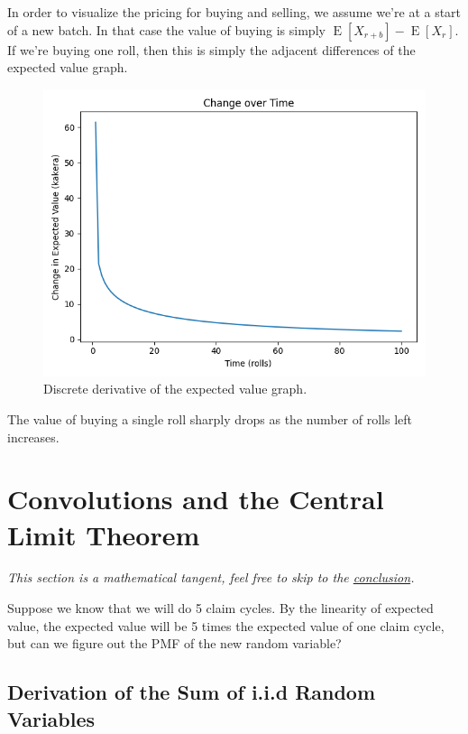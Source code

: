 \documentclass[11pt, oneside]{article}
\DeclareMathOperator{\E}{E}
\theoremstyle{plain}
\theoremstyle{definition}
\begin{document}
In order to visualize the pricing for buying and selling, we assume we're
at a start of a new batch. In that case the value of buying is simply \(
\E[X_{r + b}] - \E[X_r] \). If we're buying one roll, then this is simply
the adjacent differences of the expected value graph.
\begin{figure}[h!]
  \centering
  \includegraphics[scale=0.7]{images/graphs/deriv.png}
  \caption{Discrete derivative of the expected value graph.}
\end{figure}

The value of buying a single roll sharply
drops as the number of rolls left increases.

\section{Convolutions and the Central Limit Theorem}
\textit{This section is a mathematical tangent, feel free
to skip to the \hyperref[subsec:conclusion]{conclusion}.}

Suppose we know that we will do 5 claim cycles. By the linearity of
expected value, the expected value will be 5 times the expected value of
one claim cycle, but can we figure out the PMF of the new random variable?

\subsection{Derivation of the Sum of i.i.d Random Variables}
\end{document}
